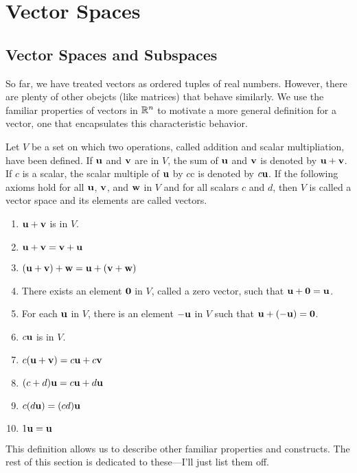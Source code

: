 \documentclass[../m073main.tex]{subfiles}
\begin{document}
\chapter{Vector Spaces}

\section{Vector Spaces and Subspaces}
So far, we have treated vectors as ordered tuples of real numbers.
However, there are plenty of other obejcts (like matrices) that behave similarly.
We use the familiar properties of vectors in $\mathbb{R}^n$ to motivate a more general definition for a vector, one that encapsulates this characteristic behavior.

\begin{definition}
	Let $V$ be a set on which two operations, called addition and scalar multipliation, have been defined.
	If $\mathbf{u}$ and $\mathbf{v}$ are in $V$, the sum of $\mathbf{u}$ and $\mathbf{v}$ is denoted by $\mathbf{u} + \mathbf{v}$.
	If $c$ is a scalar, the scalar multiple of $\mathbf{u}$ by $c$c is denoted by $c \mathbf{u}$.
	If the following axioms hold for all $\mathbf{u}$, $\mathbf{v}$, and $\mathbf{w}$ in $V$ and for all scalars $c$ and $d$, then $V$ is called a vector space and its elements are called vectors.
	\begin{enumerate}
		\item $\mathbf{u} + \mathbf{v}$ is in $V$.
		\item $\mathbf{u} + \mathbf{v} = \mathbf{v} + \mathbf{u}$
		\item $(\mathbf{u} + \mathbf{v}) + \mathbf{w} = \mathbf{u} + (\mathbf{v} + \mathbf{w})$
		\item There exists an element $\mathbf{0}$ in $V$, called a zero vector, such that $\mathbf{u} + \mathbf{0} = \mathbf{u}$.
		\item For each $\mathbf{u}$ in $V$, there is an element $-\mathbf{u}$ in $V$ such that $\mathbf{u} + (-\mathbf{u}) = \mathbf{0}$.
		\item $c \mathbf{u}$ is in $V$.
		\item $c(\mathbf{u} + \mathbf{v}) = c \mathbf{u} + c \mathbf{v}$
		\item $(c + d) \mathbf{u} = c \mathbf{u} + d \mathbf{u}$
		\item $c(d \mathbf{u}) = (cd) \mathbf{u}$
		\item $1 \mathbf{u} = \mathbf{u}$
	\end{enumerate}
\end{definition}

This definition allows us to describe other familiar properties and constructs.
The rest of this section is dedicated to these---I'll just list them off.
\end{document}
